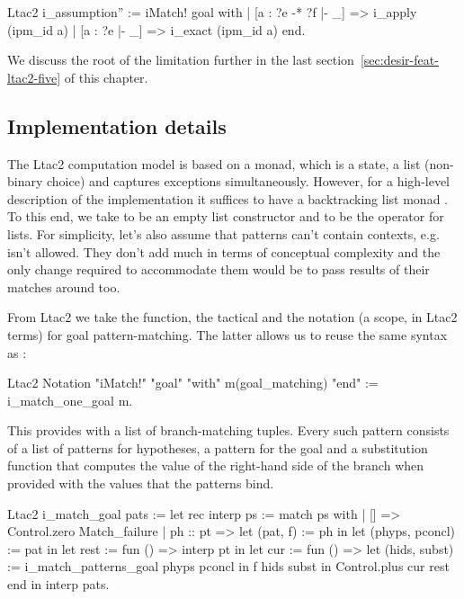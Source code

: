 \begin{itemize}
\begin{minipage}{\linewidth}
\begin{coq}
Ltac2 i_assumption'' :=
  iMatch! goal with
  | [a : ?e -* ?f |- _] => i_apply (ipm_id a)
  | [a : ?e |- _] => i_exact (ipm_id a)
  end.
\end{coq}
\end{minipage}

We discuss the root of the limitation further in the last section~\ref{sec:desir-feat-ltac2-five} of this chapter.
\end{itemize}

\subsection{Implementation details}
\label{subsec:implementation_details}

The Ltac2 computation model is based on a monad, which is a state, a list (non-binary choice) and captures exceptions simultaneously.
However, for a high-level description of the implementation it suffices to have a backtracking list monad .
To this end, we take  to be an empty list constructor
and  to be the  operator for lists.
For simplicity, let's also assume that patterns can't contain contexts, e.g.  isn't allowed.
They don't add much in terms of conceptual complexity and the only change required to accommodate them would be to pass results of their matches around too.

From Ltac2 we take the  function, the  tactical and the notation (a scope, in Ltac2 terms) for goal pattern-matching.
The latter allows us to reuse the same syntax as :
\begin{coq}
Ltac2 Notation "iMatch!" "goal" "with" m(goal_matching) "end" :=
  i_match_one_goal m.
\end{coq}
This provides  with a list of branch-matching tuples.
Every such pattern consists of a list of patterns for hypotheses, a pattern for the goal and a substitution function that computes the value of the right-hand side of the branch when provided with the values that the patterns bind.

\begin{coq}
Ltac2 i_match_goal pats :=
  let rec interp ps := match ps with
  | [] => Control.zero Match_failure
  | ph :: pt =>
    let (pat, f) := ph in
    let (phyps, pconcl) := pat in
    let rest := fun () => interp pt in
    let cur := fun () =>
      let (hids, subst) := i_match_patterns_goal phyps pconcl in
      f hids subst
    in Control.plus cur rest
  end in
  interp pats.
\end{coq}

